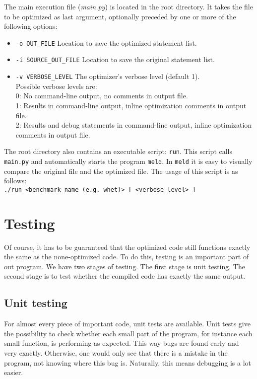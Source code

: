 \documentclass[10pt,a4paper]{article}
\begin{document}
The main execution file (\emph{main.py}) is located in the root directory. It
takes the file to be optimized as last argument, optionally preceded by one or
more of the following options:
\begin{itemize}
    \item \texttt{-o OUT\_FILE}
          Location to save the optimized statement list.
    \item \texttt{-i SOURCE\_OUT\_FILE}
          Location to save the original statement list.
    \item \texttt{-v VERBOSE\_LEVEL}
          The optimizer's verbose level (default 1). \\
          Possible verbose levels are: \\
          0: No command-line output, no comments in output file. \\
          1: Results in command-line output, inline optimization comments in
             output file. \\
          2: Results and debug statements in command-line output, inline
             optimization comments in output file. \\
\end{itemize}

The root directory also contains an executable script: \texttt{run}. This
script calls \texttt{main.py} and automatically starts the program
\texttt{meld}.  In \texttt{meld} it is easy to visually compare the original
file and the optimized file. The usage of this script is as follows: \\
\texttt{./run <benchmark name (e.g. whet)> [ <verbose level> ]}

\section{Testing}

Of course, it has to be guaranteed that the optimized code still functions
exactly the same as the none-optimized code. To do this, testing is an
important part of out program. We have two stages of testing. The first stage
is unit testing. The second stage is to test whether the compiled code has
exactly the same output.

\subsection{Unit testing}

For almost every piece of important code, unit tests are available. Unit tests
give the possibility to check whether each small part of the program, for
instance each small function, is performing as expected. This way bugs are
found early and very exactly. Otherwise, one would only see that there is a
mistake in the program, not knowing where this bug is. Naturally, this means
debugging is a lot easier.
\end{document}
